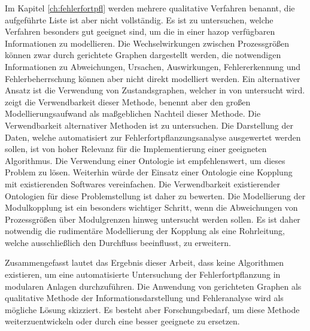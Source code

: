 Im Kapitel \ref{ch:fehlerfortpfl} werden mehrere qualitative Verfahren benannt, die aufgef\"uhrte Liste ist aber nicht vollst\"andig. Es ist zu untersuchen, welche Verfahren besonders gut geeignet sind, um die in einer \ac{hazop} verf\"ugbaren Informationen zu modellieren. Die Wechselwirkungen zwischen Prozessgr\"o\ss{}en k\"onnen zwar durch gerichtete Graphen dargestellt werden, die notwendigen Informationen zu Abweichungen, Ursachen, Auswirkungen, Fehlererkennung und Fehlerbeherrschung k\"onnen aber nicht direkt modelliert werden. Ein alternativer Ansatz ist die Verwendung von Zustandsgraphen, welcher in \cite{Graf_2000, Graf_2000a} von \citeauthor{Graf_2000} untersucht wird. \citeauthor{Graf_2000} zeigt die Verwendbarkeit dieser Methode, benennt aber den gro\ss{}en Modellierungsaufwand als ma\ss{}geblichen Nachteil dieser Methode. Die Verwendbarkeit alternativer Methoden ist zu untersuchen. \newline
Die Darstellung der Daten, welche automatisiert zur Fehlerfortpflanzungsanalyse ausgewertet werden sollen, ist von hoher Relevanz f\"ur die Implementierung einer geeigneten Algorithmus. Die Verwendung einer Ontologie ist empfehlenswert, um dieses Problem zu l\"osen. Weiterhin w\"urde der Einsatz einer Ontologie eine Kopplung mit existierenden Softwares vereinfachen. Die Verwendbarkeit existierender Ontologien f\"ur diese Problemstellung ist daher zu bewerten. \newline
Die Modellierung der Modulkopplung ist ein besonders wichtiger Schritt, wenn die Abweichungen von Prozessgr\"o\ss{}en \"uber Modulgrenzen hinweg untersucht werden sollen. Es ist daher notwendig die rudiment\"are Modellierung der Kopplung als eine Rohrleitung, welche ausschlie\ss{}lich den Durchfluss beeinflusst, zu erweitern.

Zusammengefasst lautet das Ergebnis dieser Arbeit, dass keine Algorithmen existieren, um eine automatisierte Untersuchung der Fehlerfortpflanzung in modularen Anlagen durchzuf\"uhren. Die Anwendung von gerichteten Graphen als qualitative Methode der Informationsdarstellung und Fehleranalyse wird als m\"ogliche L\"osung skizziert. Es besteht aber Forschungsbedarf, um diese Methode weiterzuentwickeln oder durch eine besser geeignete zu ersetzen. 
